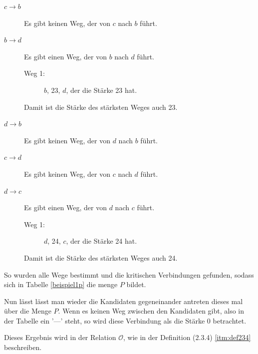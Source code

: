 \begin{description}
\item[$c \to b$] Es gibt keinen Weg, der von $c$ nach $b$ führt.

\item[$b \to d$] Es gibt einen Weg, der von $b$ nach $d$ führt.
	\begin{description}
	\item[Weg 1:] $b$, 23, $d$, der die Stärke 23 hat.
	\end{description}
	Damit ist die Stärke des stärksten Weges auch 23.
	
\item[$d \to b$] Es gibt keinen Weg, der von $d$ nach $b$ führt.

\item[$c \to d$] Es gibt keinen Weg, der von $c$ nach $d$ führt.
	
\item[$d \to c$] Es gibt einen Weg, der von $d$ nach $c$ führt.
	\begin{description}
	\item[Weg 1:] $d$, 24, $c$, der die Stärke 24 hat.
	\end{description}
	Damit ist die Stärke des stärksten Weges auch 24.	
\end{description}

So wurden alle Wege bestimmt und die kritischen Verbindungen gefunden, sodass sich in Tabelle \ref{beispiel1p} die menge $P$ bildet.



Nun lässt lässt man wieder die Kandidaten gegeneinander antreten dieses mal über die Menge $P$. Wenn es keinen Weg zwischen den Kandidaten gibt, also in der Tabelle ein '---' steht, so wird diese Verbindung als die Stärke 0 betrachtet.

Dieses Ergebnis wird in der Relation $\mathcal{O}$, wie in der Definition (2.3.4) \ref{itm:def234} beschreiben.


